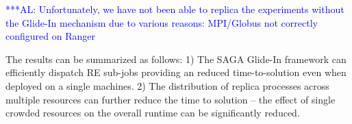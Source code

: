 \documentclass{rspublic}
\newcommand{\alnote}[1]{ {\textcolor{blue} { ***AL: #1 }}}
\newcommand{\alnote}[1]{}
\begin{document}
{\alnote{Unfortunately, we have not been able to replica the
  experiments without the Glide-In mechanism due to various reasons:
  MPI/Globus not correctly configured on Ranger}

The results can be summarized as follows: 1) The SAGA Glide-In
framework can efficiently dispatch RE sub-jobs providing an reduced
time-to-solution even when deployed on a single machines.  2) The
distribution of replica processes across multiple resources can
further reduce the time to solution -- the effect of single crowded
resources on the overall runtime can be significantly reduced.



         
% 
% 
% 
% 
% 

}
\end{document}
